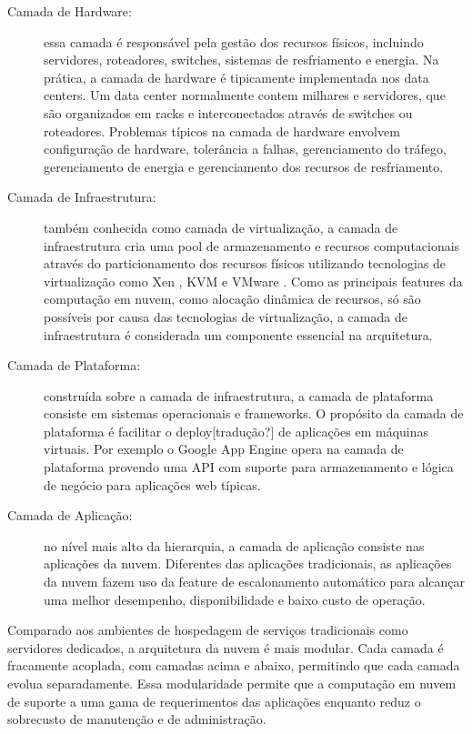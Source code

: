 \begin{description}

	\item[Camada de Hardware:] essa camada é responsável pela gestão dos recursos físicos, incluindo servidores, roteadores, switches, sistemas de resfriamento e energia. Na prática, a camada de hardware é tipicamente implementada nos data centers. Um data center normalmente contem milhares e servidores, que são organizados em racks e interconectados através de switches ou roteadores. Problemas típicos na camada de hardware envolvem configuração de hardware, tolerância a falhas, gerenciamento do tráfego, gerenciamento de energia e gerenciamento dos recursos de resfriamento.

	\item[Camada de Infraestrutura:] também conhecida como camada de virtualização, a camada de infraestrutura cria uma pool de armazenamento e recursos computacionais através do particionamento dos recursos físicos utilizando tecnologias de virtualização como Xen \cite{Xen:Online}, KVM \cite{KVM:Online} e VMware \cite{VMware:Online}. Como as principais features da computação em nuvem, como alocação dinâmica de recursos, só são possíveis por causa das tecnologias de virtualização, a camada de infraestrutura é considerada um componente essencial na arquitetura.

	\item[Camada de Plataforma:] construída sobre a camada de infraestrutura, a camada de plataforma consiste em sistemas operacionais e frameworks. O propósito da camada de plataforma é facilitar o deploy[tradução?] de aplicações em máquinas virtuais. Por exemplo o Google App Engine opera na camada de plataforma provendo uma API com suporte para armazenamento e lógica de negócio para aplicações web típicas. 

	\item[Camada de Aplicação:] no nível mais alto da hierarquia, a camada de aplicação consiste nas aplicações da nuvem. Diferentes das aplicações tradicionais, as aplicações da nuvem fazem uso da feature de escalonamento automático para alcançar uma melhor desempenho, disponibilidade e baixo custo de operação.

\end{description}

Comparado aos ambientes de hospedagem de serviços tradicionais como servidores dedicados, a arquitetura da nuvem é mais modular. Cada camada é fracamente acoplada, com camadas acima e abaixo, permitindo que cada camada evolua separadamente. Essa modularidade permite que a computação em nuvem de suporte a uma gama de requerimentos das aplicações enquanto reduz o sobrecusto de manutenção e de administração.

